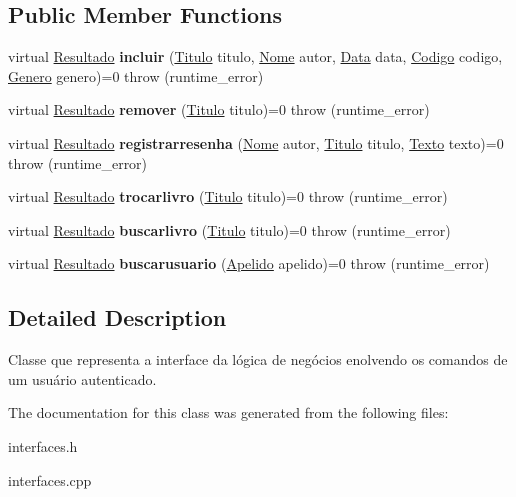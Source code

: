 \subsection*{Public Member Functions}
\begin{DoxyCompactItemize}
\item 
\mbox{\label{classILNComandosusuarioautenticado_a2d9c44258dd4f034f92b9d90cce4d5a0}} 
virtual \hyperlink{classResultado}{Resultado} {\bfseries incluir} (\hyperlink{classTitulo}{Titulo} titulo, \hyperlink{classNome}{Nome} autor, \hyperlink{classData}{Data} data, \hyperlink{classCodigo}{Codigo} codigo, \hyperlink{classGenero}{Genero} genero)=0  throw (runtime\+\_\+error)
\item 
\mbox{\label{classILNComandosusuarioautenticado_af1f5d25942fbc18841838b60bba0b868}} 
virtual \hyperlink{classResultado}{Resultado} {\bfseries remover} (\hyperlink{classTitulo}{Titulo} titulo)=0  throw (runtime\+\_\+error)
\item 
\mbox{\label{classILNComandosusuarioautenticado_a6350b5c4f52ec300899638627d31e676}} 
virtual \hyperlink{classResultado}{Resultado} {\bfseries registrarresenha} (\hyperlink{classNome}{Nome} autor, \hyperlink{classTitulo}{Titulo} titulo, \hyperlink{classTexto}{Texto} texto)=0  throw (runtime\+\_\+error)
\item 
\mbox{\label{classILNComandosusuarioautenticado_a4147962a17bad6c64af5444bcc83bc6d}} 
virtual \hyperlink{classResultado}{Resultado} {\bfseries trocarlivro} (\hyperlink{classTitulo}{Titulo} titulo)=0  throw (runtime\+\_\+error)
\item 
\mbox{\label{classILNComandosusuarioautenticado_a11ba81d307ab0c6fc0029b32e0c56acc}} 
virtual \hyperlink{classResultado}{Resultado} {\bfseries buscarlivro} (\hyperlink{classTitulo}{Titulo} titulo)=0  throw (runtime\+\_\+error)
\item 
\mbox{\label{classILNComandosusuarioautenticado_ab8134fdea0245c440b7856c5ec45f343}} 
virtual \hyperlink{classResultado}{Resultado} {\bfseries buscarusuario} (\hyperlink{classApelido}{Apelido} apelido)=0  throw (runtime\+\_\+error)
\end{DoxyCompactItemize}


\subsection{Detailed Description}
Classe que representa a interface da lógica de negócios enolvendo os comandos de um usuário autenticado. 

The documentation for this class was generated from the following files\+:\begin{DoxyCompactItemize}
\item 
interfaces.\+h\item 
interfaces.\+cpp\end{DoxyCompactItemize}
